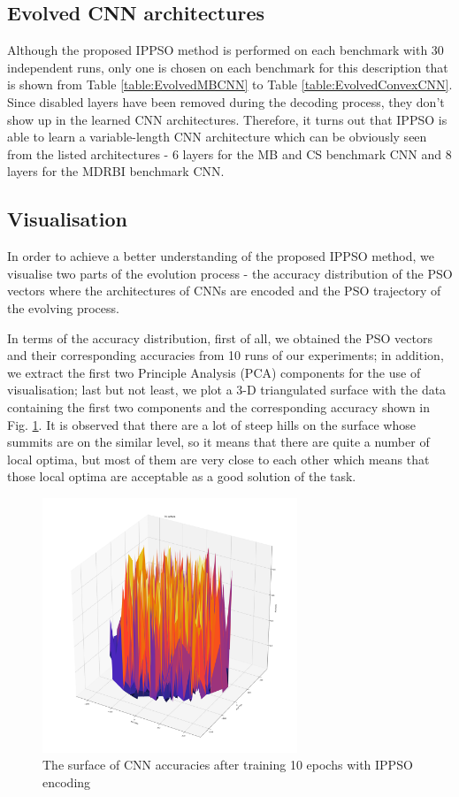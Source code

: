 \documentclass[conference]{IEEEtran}
\begin{document}
\subsection{Evolved CNN architectures}\label{sec:EvolvedCNN}

Although the proposed IPPSO method is performed on each benchmark with 30 independent runs, only one is chosen on each benchmark for this description that is shown from Table \ref{table:EvolvedMBCNN} to Table \ref{table:EvolvedConvexCNN}. Since disabled layers have been removed during the decoding process, they don't show up in the learned CNN architectures. Therefore, it turns out that IPPSO is able to learn a variable-length CNN architecture which can be obviously seen from the listed architectures - 6 layers for the MB and CS benchmark CNN and 8 layers for the MDRBI benchmark CNN. 

\subsection{Visualisation}

In order to achieve a better understanding of the proposed IPPSO method, we visualise two parts of the evolution process - the accuracy distribution of the PSO vectors where the architectures of CNNs are encoded and the PSO trajectory of the evolving process. 


In terms of the accuracy distribution, first of all, we obtained the PSO vectors and their corresponding accuracies from 10 runs of our experiments; in addition, we extract the first two Principle Analysis (PCA) components for the use of visualisation; last but not least, we plot a 3-D triangulated surface with the data containing the first two components and the corresponding accuracy shown in Fig. \ref{fig:Visual3DSurface}. It is observed that there are a lot of steep hills on the surface whose summits are on the similar level, so it means that there are quite a number of local optima, but most of them are very close to each other which means that those local optima are acceptable as a good solution of the task. 

\begin{figure}[!t]
	\centering
	\includegraphics[width=3in]{ipec_pca_plot_2d_surface}
	\caption{The surface of CNN accuracies after training 10 epochs with IPPSO encoding}
	\label{fig:Visual3DSurface}
\end{figure}
\end{document}

